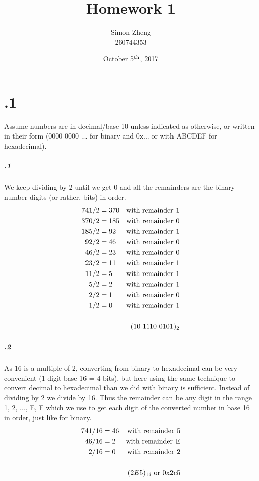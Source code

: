 \documentclass[11pt,letterpaper]{article}
\author{Simon Zheng\\260744353}
\title{Homework 1}
\date{October 5$^{\textnormal{th}}$, 2017}
\begin{document}
	\maketitle
	\thispagestyle{fancy}
	
	\section{.1}
	Assume numbers are in decimal/base 10 unless indicated as otherwise, or written in their form (0000 0000 ... for binary and 0x... or with ABCDEF for hexadecimal).
	
		\subparagraph{.1}
		We keep dividing by 2 until we get 0 and all the remainders are the binary number digits (or rather, bits) in order.
		\begin{align*}
		741 / 2 &= 370&\textnormal{with remainder 1}\\
		370 / 2 &= 185&\textnormal{with remainder 0}\\
		185 / 2 &=  92&\textnormal{with remainder 1}\\
		 92 / 2 &=  46&\textnormal{with remainder 0}\\
		 46 / 2 &=  23&\textnormal{with remainder 0}\\
		 23 / 2 &=  11&\textnormal{with remainder 1}\\
		 11 / 2 &=   5&\textnormal{with remainder 1}\\
		  5 / 2 &=   2&\textnormal{with remainder 1}\\
		  2 / 2 &=   1&\textnormal{with remainder 0}\\
		  1 / 2 &=   0&\textnormal{with remainder 1}\\
		\\
		&&(10\ 1110\ 0101)_2
		\end{align*}
		
		\subparagraph{.2}
		As 16 is a multiple of 2, converting from binary to hexadecimal can be very convenient (1 digit base 16 = 4 bits), but here using the same technique to convert decimal to hexadecimal than we did with binary is sufficient. Instead of dividing by 2 we divide by 16. Thus the remainder can be any digit in the range 1, 2, ..., E, F which we use to get each digit of the converted number in base 16 in order, just like for binary.
		\begin{align*}
		741 / 16 &= 46&\textnormal{with remainder 5}\\
		 46 / 16 &=  2&\textnormal{with remainder E}\\
		  2 / 16 &=  0&\textnormal{with remainder 2}\\
		\\
		&&(2E5)_{16}\textnormal{ or 0x2e5}
		\end{align*}
		
\end{document}
